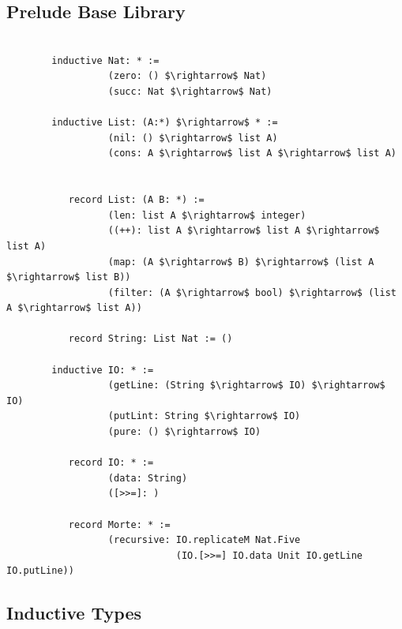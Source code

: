 \documentclass[11pt,oneside]{article}
\begin{document}
\subsection{Prelude Base Library}

\begin{lstlisting}[mathescape=true]

        inductive Nat: * :=
                  (zero: () $\rightarrow$ Nat)
                  (succ: Nat $\rightarrow$ Nat)

        inductive List: (A:*) $\rightarrow$ * :=
                  (nil: () $\rightarrow$ list A)
                  (cons: A $\rightarrow$ list A $\rightarrow$ list A)


           record List: (A B: *) :=
                  (len: list A $\rightarrow$ integer)
                  ((++): list A $\rightarrow$ list A $\rightarrow$ list A)
                  (map: (A $\rightarrow$ B) $\rightarrow$ (list A $\rightarrow$ list B))
                  (filter: (A $\rightarrow$ bool) $\rightarrow$ (list A $\rightarrow$ list A))

           record String: List Nat := ()

        inductive IO: * :=
                  (getLine: (String $\rightarrow$ IO) $\rightarrow$ IO)
                  (putLint: String $\rightarrow$ IO)
                  (pure: () $\rightarrow$ IO)

           record IO: * :=
                  (data: String)
                  ([>>=]: )

           record Morte: * :=
                  (recursive: IO.replicateM Nat.Five
                              (IO.[>>=] IO.data Unit IO.getLine IO.putLine))

\end{lstlisting}

\newpage
   \subsection{Inductive Types}
\end{document}

